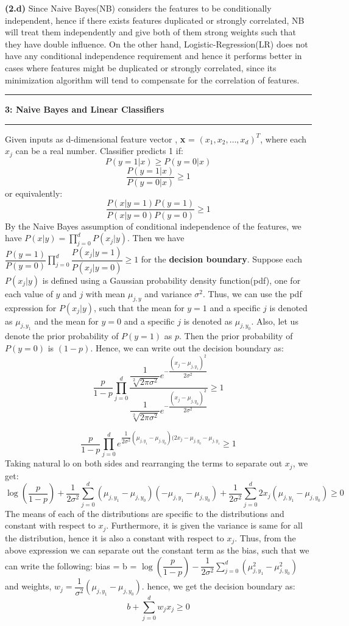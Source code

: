 \documentclass{article}
\newcommand\question[2]{\vspace{.25in}\hrule\textbf{#1: #2}\hrule\vspace{.10in}}
\renewcommand\part[1]{\vspace{.10in}\textbf{(#1)}}
\begin{document}
	\part{2.d} Since Naive Bayes(NB) considers the features to be conditionally independent, hence if there exists features duplicated or strongly correlated, NB will treat them independently and give both of them strong weights such that they have double influence. On the other hand, Logistic-Regression(LR) does not have any conditional independence requirement and hence it performs better in cases where features might be duplicated or strongly correlated, since its minimization algorithm will tend to compensate for the correlation of features.

	\question{3}{Naive Bayes and Linear Classifiers}
	Given inputs as d-dimensional feature vector , \textbf {x} = $(x_1,x_2,\dots , x_d)^T$, where each $x_j$ can be a real number. Classifier predicts 1 if:
	\[ P(y=1 | x) \geq P(y=0 | x) \]
	\[ \dfrac{P(y=1 | x)}{P(y=0 | x)} \geq 1 \]
	or equivalently:
	\[ \dfrac{P(x|y=1)P(y=1)}{P(x|y=0)P(y=0)} \geq 1\]
	By the Naive Bayes assumption of conditional independence of the features, we have $P(x|y) = \prod_{j=0}^d P(x_j|y)$. Then we have $\dfrac{P(y=1)}{P(y=0)}\prod_{j=0}^d \dfrac{P(x_j|y=1)}{P(x_j|y=0)} \geq 1$ for the \textbf {decision boundary}. Suppose each $P(x_j|y)$ is defined using a Gaussian probability density function(pdf), one for each value of $y$ and $j$ with mean $\mu_{j,y}$ and variance $\sigma^2$. Thus, we can use the pdf expression for $P(x_j|y)$, such that the mean for $y=1$ and a specific $j$ is denoted as $\mu_{j,y_1}$ and the mean for $y=0$ and a specific $j$ is denoted as $\mu_{j,y_0}$. Also, let us denote the prior probability of $P(y=1)$ as $p$. Then the prior probability of $P(y=0)$ is $(1-p)$.
 Hence, we can write out the decision boundary as:
	\[\dfrac{p}{1-p} \prod_{j=0}^d \dfrac{\dfrac{1}{\sqrt[2]{2\pi \sigma^2}}e^{-\dfrac{(x_j - \mu_{j,y_1})^2}{2\sigma^2}}}{\dfrac{1}{\sqrt[2]{2\pi \sigma^2}}e^{-\dfrac{(x_j - \mu_{j,y_0})^2}{2\sigma^2}}} \geq 1\]

	\[\dfrac{p}{1-p} \prod_{j=0}^d e^{\dfrac{1}{2\sigma^2}(\mu_{j,y_1} - \mu_{j,y_0})(2x_j - \mu_{j,y_0} - \mu_{j,y_1}} \geq 1\]
	Taking natural lo on both sides and rearranging the terms to separate out $x_j$, we get:
	\[\log(\dfrac{p}{1-p}) + \dfrac{1}{2\sigma^2}\sum_{j=0}^d (\mu_{j,y_1} - \mu_{j,y_0})(-\mu_{j,y_1} - \mu_{j,y_0}) + \dfrac{1}{2\sigma^2} \sum_{j=0}^d 2x_j (\mu_{j,y_1} - \mu_{j,y_0}) \geq 0\]
	The means of each of the distributions are specific to the distributions and constant with respect to $x_j$. Furthermore, it is given the variance is same for all the distribution, hence it is also a constant with respect to $x_j$. Thus, from the above expression we can separate out the constant term as the bias, such that we can write the following: \newline
	bias = b = $\log(\dfrac{p}{1-p}) - \dfrac{1}{2\sigma^2}\sum_{j=0}^d (\mu_{j,y_1}^2 - \mu_{j,y_0}^2)$ and \newline
	weights, $w_j = \dfrac{1}{\sigma^2}(\mu_{j,y_1} - \mu_{j,y_0})$. \newline
	hence, we get the decision boundary as:
	\[ b + \sum_{j=0}^d w_jx_j \geq 0\]
\end{document}
